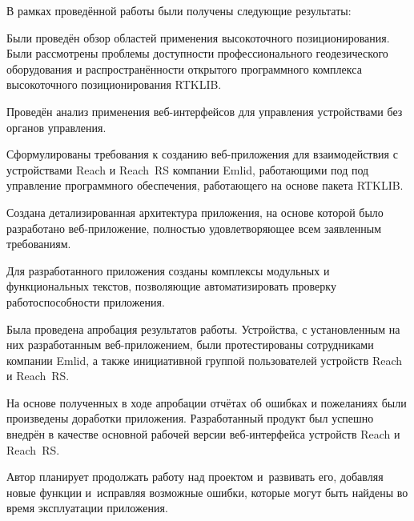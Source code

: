 
В рамках проведённой работы были получены следующие результаты:
\begin{dashitemize}
  \item Были проведён обзор областей применения высокоточного позиционирования. Были рассмотрены проблемы доступности профессионального геодезического оборудования и распространённости открытого программного комплекса высокоточного позиционирования RTKLIB.
  \item Проведён анализ применения веб-интерфейсов для управления устройствами без органов управления.
  \item Сформулированы требования к созданию веб-приложения для взаимодействия с устройствами Reach и Reach~RS компании Emlid, работающими под под управление программного обеспечения, работающего на основе пакета RTKLIB.
  \item Создана детализированная архитектура приложения, на основе которой было разработано веб-приложение, полностью удовлетворяющее всем заявленным требованиям.
  \item Для разработанного приложения созданы комплексы модульных и функциональных текстов, позволяющие автоматизировать проверку работоспособности приложения.
  \item Была проведена апробация результатов работы. Устройства, с установленным на них разработанным веб-приложением, были протестированы сотрудниками компании Emlid, а также инициативной группой пользователей устройств Reach и Reach~RS.
  \item На основе полученных в ходе апробации отчётах об ошибках и пожеланиях были произведены доработки приложения. Разработанный продукт был успешно внедрён в качестве основной рабочей версии веб-интерфейса устройств Reach и Reach~RS.
\end{dashitemize}

\newpage

Автор планирует продолжать работу над проектом и~развивать его, добавляя новые функции и~исправляя возможные ошибки, которые могут быть найдены во время эксплуатации приложения.

\newpage
